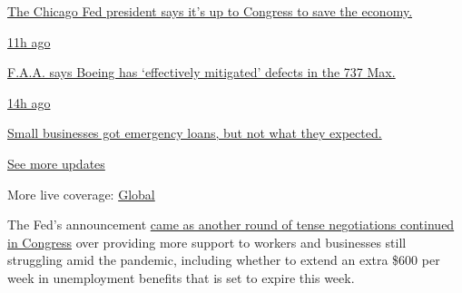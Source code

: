 \href{https://www.nytimes3xbfgragh.onion/live/2020/08/03/business/stock-market-today-coronavirus?action=click\&pgtype=Article\&state=default\&region=MAIN_CONTENT_1\&context=storylines_live_updates\#the-chicago-fed-president-says-its-up-to-congress-to-save-the-economy}{The
Chicago Fed president says it's up to Congress to save the economy.}

\href{https://www.nytimes3xbfgragh.onion/live/2020/08/03/business/stock-market-today-coronavirus?action=click\&pgtype=Article\&state=default\&region=MAIN_CONTENT_1\&context=storylines_live_updates\#faa-says-boeing-has-effectively-mitigated-defects-in-the-737-max}{11h
ago}

\href{https://www.nytimes3xbfgragh.onion/live/2020/08/03/business/stock-market-today-coronavirus?action=click\&pgtype=Article\&state=default\&region=MAIN_CONTENT_1\&context=storylines_live_updates\#faa-says-boeing-has-effectively-mitigated-defects-in-the-737-max}{F.A.A.
says Boeing has `effectively mitigated' defects in the 737 Max.}

\href{https://www.nytimes3xbfgragh.onion/live/2020/08/03/business/stock-market-today-coronavirus?action=click\&pgtype=Article\&state=default\&region=MAIN_CONTENT_1\&context=storylines_live_updates\#small-businesses-got-emergency-loans-but-not-what-they-expected}{14h
ago}

\href{https://www.nytimes3xbfgragh.onion/live/2020/08/03/business/stock-market-today-coronavirus?action=click\&pgtype=Article\&state=default\&region=MAIN_CONTENT_1\&context=storylines_live_updates\#small-businesses-got-emergency-loans-but-not-what-they-expected}{Small
businesses got emergency loans, but not what they expected.}

\href{https://www.nytimes3xbfgragh.onion/live/2020/08/03/business/stock-market-today-coronavirus?action=click\&pgtype=Article\&state=default\&region=MAIN_CONTENT_1\&context=storylines_live_updates}{See
more updates}

More live coverage:
\href{https://www.nytimes3xbfgragh.onion/2020/08/03/world/coronavirus-covid-19.html?action=click\&pgtype=Article\&state=default\&region=MAIN_CONTENT_1\&context=storylines_live_updates}{Global}

The Fed's announcement
\href{https://www.nytimes3xbfgragh.onion/2020/07/28/business/us-lawmakers-deliberate-over-another-aid-package.html}{came
as another round of tense negotiations continued in Congress} over
providing more support to workers and businesses still struggling amid
the pandemic, including whether to extend an extra \$600 per week in
unemployment benefits that is set to expire this week.

